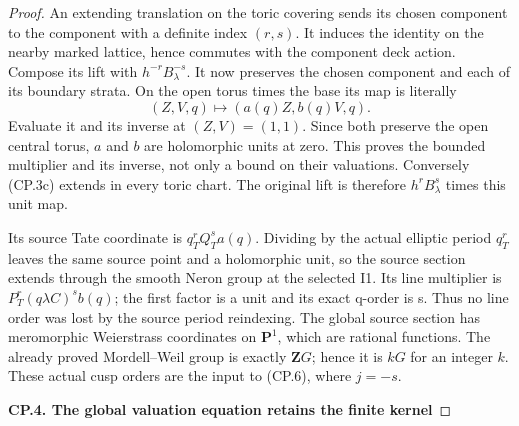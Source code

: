 \begin{proof}
An extending translation on the toric covering sends its chosen
component to the component with a definite index \((r,s)\).
It induces the identity on the nearby marked lattice, hence commutes
with the component deck action. Compose its lift with
\(h^{-r}B_\lambda^{-s}\). It now preserves the chosen component
and each of its boundary strata. On the open torus times the base
its map is literally
\[
                  (Z,V,q)\longmapsto(a(q)Z,b(q)V,q).
                                                               \tag{CP.3c}
\]
Evaluate it and its inverse at \((Z,V)=(1,1)\). Since both preserve
the open central torus, \(a\) and \(b\) are holomorphic units
at zero. This proves the bounded multiplier and its inverse, not
only a bound on their valuations. Conversely (CP.3c) extends in
every toric chart. The original lift is therefore
\(h^rB_\lambda^s\) times this unit map.

Its source Tate coordinate is \(q_T^r Q_T^s a(q)\). Dividing by
the actual elliptic period \(q_T^r\) leaves the same source point
and a holomorphic unit, so the source section extends through the
smooth Neron group at the selected I1. Its line multiplier is
\(P_T^r(q\lambda C)^s b(q)\); the first factor is a unit and
its exact q-order is s. Thus no line order was lost by the source
period reindexing. The global source section has meromorphic
Weierstrass coordinates on \(\mathbf P^1\), which are rational
functions. The already proved Mordell--Weil group is exactly
\(\mathbf ZG\); hence it is \(kG\) for an integer \(k\). These actual
cusp orders are the input to (CP.6), where \(j=-s\).

\par

\medskip\noindent\textbf{CP.4. The global valuation equation retains the finite kernel}

\par\nobreak


\end{proof}
